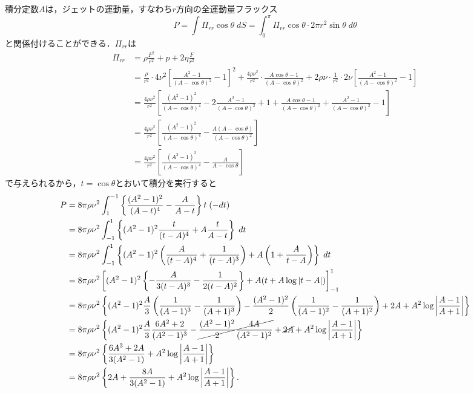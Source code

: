 積分定数$A$は，ジェットの運動量，すなわち$r$方向の全運動量フラックス
\[
    P = \int \varPi_{rr} \cos\theta \; dS = \int_{0}^{\pi} \varPi_{rr} \cos\theta \cdot 2\pi r^2 \sin\theta \; d\theta
\]
と関係付けることができる．$\varPi_{rr}$は
\begin{align*}
    \varPi_{rr} &= \rho\frac{F^2}{r^2} + p + 2\eta \frac{F}{r^2} \\
    &= \frac{\rho}{r^2} \cdot 4\nu^2 \left[ \frac{A^2-1}{(A-\cos\theta)^2} -1 \right]^2
    + \frac{4\rho\nu^2}{r^2} \cdot \frac{A\cos\theta-1}{(A-\cos\theta)^2}
    + 2\rho\nu \cdot \frac{1}{r^2} \cdot 2\nu \left[ \frac{A^2-1}{(A-\cos\theta)^2} -1 \right] \\
    &= \frac{4\rho\nu^2}{r^2} \left[ 
        \frac{(A^2-1)^2}{(A-\cos\theta)^4} -2 \frac{A^2-1}{(A-\cos\theta)^2} + 1
        + \frac{A\cos\theta-1}{(A-\cos\theta)^2} + \frac{A^2-1}{(A-\cos\theta)^2} -1
     \right] \\
     &= \frac{4\rho\nu^2}{r^2} \left[ \frac{(A^2-1)^2}{(A-\cos\theta)^4} - \frac{A(A-\cos\theta)}{(A-\cos\theta)^2} \right] \\
     &= \frac{4\rho\nu^2}{r^2} \left[ \frac{(A^2-1)^2}{(A-\cos\theta)^4} - \frac{A}{A-\cos\theta} \right] 
\end{align*}
で与えられるから，$t=\cos\theta$とおいて積分を実行すると
\begin{align*}
    P &= 8\pi\rho\nu^2 \int_{1}^{-1} \left\{ \frac{(A^2-1)^2}{(A-t)^4} - \frac{A}{A-t} \right\} t \; (-dt) \\
    &= 8\pi\rho\nu^2 \int_{-1}^{1} \left\{ (A^2-1)^2 \frac{t}{(t-A)^4} +A \frac{t}{A-t} \right\} \; dt \\
    &= 8\pi\rho\nu^2 \int_{-1}^{1} \left\{ (A^2-1)^2 \left( \frac{A}{(t-A)^4} + \frac{1}{(t-A)^3} \right) +A \left( 1 + \frac{A}{t-A} \right) \right\} \; dt \\
    &= 8\pi\rho\nu^2 \left[ (A^2-1)^2 \left\{ -\frac{A}{3(t-A)^3} - \frac{1}{2(t-A)^2} \right\} +A (t+A\log|t-A|) \right]_{-1}^{1} \\
    &= 8\pi\rho\nu^2 \left\{ (A^2-1)^2 \frac{A}{3} \left( \frac{1}{(A-1)^3} - \frac{1}{(A+1)^3} \right) 
    - \frac{(A^2-1)^2}{2} \left( \frac{1}{(A-1)^2} - \frac{1}{(A+1)^2} \right) + 2A + A^2 \log \left| \frac{A-1}{A+1} \right| \right\} \\
    &= 8\pi\rho\nu^2 \left\{ (A^2-1)^2 \frac{A}{3} \frac{6A^2+2}{(A^2-1)^3} - \cancel{ \frac{(A^2-1)^2}{2} \frac{4A}{(A^2-1)^2} }
    + \cancel{2A} + A^2 \log \left| \frac{A-1}{A+1} \right| \right\} \\
    &= 8\pi\rho\nu^2 \left\{ \frac{6A^3+2A}{3(A^2-1)} + A^2 \log \left| \frac{A-1}{A+1} \right| \right\} \\
    &= 8\pi\rho\nu^2 \left\{ 2A + \frac{8A}{3(A^2-1)} + A^2 \log \left| \frac{A-1}{A+1} \right| \right\} .
\end{align*}
